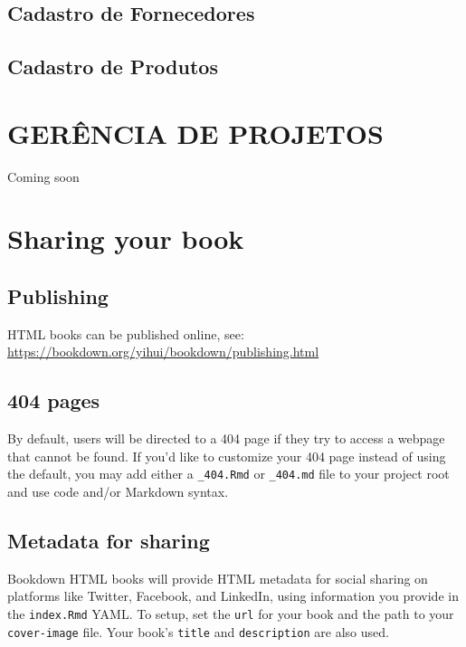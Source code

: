 \documentclass[
]{book}
\begin{document}
\section{Cadastro de Fornecedores}\label{cadastro-de-fornecedores}

\section{Cadastro de Produtos}\label{cadastro-de-produtos}

\chapter{GERÊNCIA DE PROJETOS}\label{geruxeancia-de-projetos}

Coming soon

\chapter{Sharing your book}\label{sharing-your-book}

\section{Publishing}\label{publishing}

HTML books can be published online, see: \url{https://bookdown.org/yihui/bookdown/publishing.html}

\section{404 pages}\label{pages}

By default, users will be directed to a 404 page if they try to access a webpage that cannot be found. If you'd like to customize your 404 page instead of using the default, you may add either a \texttt{\_404.Rmd} or \texttt{\_404.md} file to your project root and use code and/or Markdown syntax.

\section{Metadata for sharing}\label{metadata-for-sharing}

Bookdown HTML books will provide HTML metadata for social sharing on platforms like Twitter, Facebook, and LinkedIn, using information you provide in the \texttt{index.Rmd} YAML. To setup, set the \texttt{url} for your book and the path to your \texttt{cover-image} file. Your book's \texttt{title} and \texttt{description} are also used.
\end{document}
